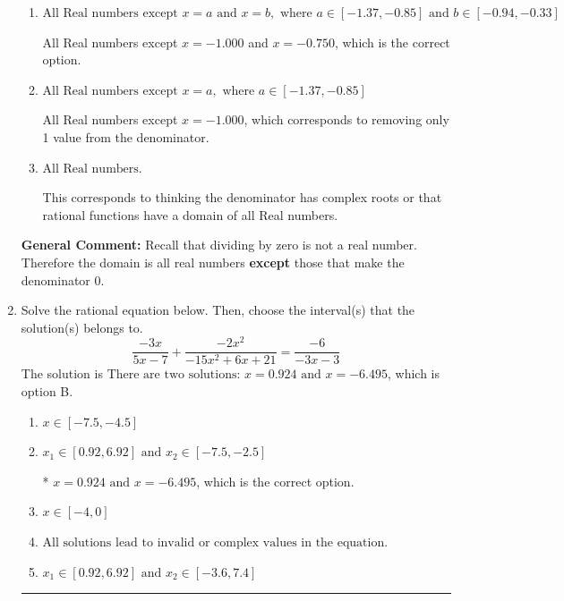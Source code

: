 \documentclass{extbook}[14pt]
\newcommand{\litem}[1]{\item #1

\rule{\textwidth}{0.4pt}}
\begin{document}
\begin{enumerate}
{\begin{enumerate}[label=\Alph*.]
All Real numbers except $x = -12.000$, which corresponds to removing a distractor value from the denominator.
\item \( \text{All Real numbers except } x = a \text{ and } x = b, \text{ where } a \in [-1.37, -0.85] \text{ and } b \in [-0.94, -0.33] \)

All Real numbers except $x = -1.000$ and $x = -0.750$, which is the correct option.
\item \( \text{All Real numbers except } x = a, \text{ where } a \in [-1.37, -0.85] \)

All Real numbers except $x = -1.000$, which corresponds to removing only 1 value from the denominator.
\item \( \text{All Real numbers.} \)

This corresponds to thinking the denominator has complex roots or that rational functions have a domain of all Real numbers.
\end{enumerate}

\textbf{General Comment:} Recall that dividing by zero is not a real number. Therefore the domain is all real numbers \textbf{except} those that make the denominator 0.
}
\litem{
Solve the rational equation below. Then, choose the interval(s) that the solution(s) belongs to.
\[ \frac{-3x}{5x -7} + \frac{-2x^{2}}{-15x^{2} +6 x + 21} = \frac{-6}{-3x -3} \]The solution is \( \text{There are two solutions: } x = 0.924 \text{ and } x = -6.495 \), which is option B.\begin{enumerate}[label=\Alph*.]
\item \( x \in [-7.5,-4.5] \)


\item \( x_1 \in [0.92, 6.92] \text{ and } x_2 \in [-7.5,-2.5] \)

* $x = 0.924 \text{ and } x = -6.495$, which is the correct option.
\item \( x \in [-4,0] \)


\item \( \text{All solutions lead to invalid or complex values in the equation.} \)


\item \( x_1 \in [0.92, 6.92] \text{ and } x_2 \in [-3.6,7.4] \)


\end{enumerate}

}
\end{enumerate}
\end{document}
